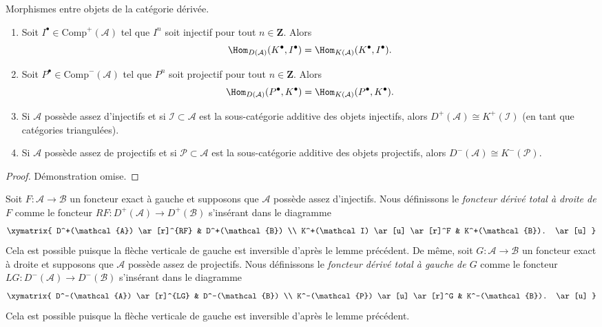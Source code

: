 \begin{lemma}
\label{lemma-derived-categories}
Morphismes entre objets de la catégorie dérivée.
\begin{enumerate}
\item
Soit $I^\bullet \in \text{Comp}^+(\mathcal{A})$ tel que $I^n$ soit injectif pour tout
$n \in \mathbf{Z}$. Alors
$$
\Hom_{D(\mathcal{A})}(K^\bullet, I^\bullet)
=
\Hom_{K(\mathcal{A})}(K^\bullet, I^\bullet).
$$
\item
Soit $P^\bullet \in \text{Comp}^-(\mathcal{A})$ tel que $P^n$ soit projectif pour tout
$n \in \mathbf{Z}$. Alors
$$
\Hom_{D(\mathcal{A})}(P^\bullet, K^\bullet)
=
\Hom_{K(\mathcal{A})}(P^\bullet, K^\bullet).
$$
\item
Si $\mathcal{A}$ possède assez d'injectifs et si $\mathcal{I} \subset \mathcal{A}$
est la sous-catégorie additive des objets injectifs, alors
$
D^+(\mathcal{A})\cong K^+(\mathcal{I})
$
(en tant que catégories triangulées).
\item
Si $\mathcal{A}$ possède assez de projectifs et si $\mathcal{P} \subset \mathcal{A}$
est la sous-catégorie additive des objets projectifs, alors
$
D^-(\mathcal{A}) \cong K^-(\mathcal{P}).
$
\end{enumerate}
\end{lemma}

\begin{proof}
Démonstration omise.
\end{proof}

\begin{definition}
\label{definition-derived-functor}
Soit $F: \mathcal{A} \to \mathcal{B}$ un foncteur exact à gauche et supposons que
$\mathcal{A}$ possède assez d'injectifs. Nous définissons le {\it foncteur dérivé total
à droite de $F$} comme le foncteur $RF: D^+(\mathcal{A}) \to D^+(\mathcal{B})$
s'insérant dans le diagramme
$$
\xymatrix{
D^+(\mathcal{A}) \ar[r]^{RF} & D^+(\mathcal{B}) \\
K^+(\mathcal I) \ar[u] \ar[r]^F & K^+(\mathcal{B}). \ar[u]
}
$$
Cela est possible puisque la flèche verticale de gauche est inversible d'après le lemme
précédent. De même, soit $G: \mathcal{A} \to \mathcal{B}$ un foncteur exact à droite
et supposons que $\mathcal{A}$ possède assez de projectifs. Nous définissons le
{\it foncteur dérivé total à gauche de $G$} comme le foncteur $LG: D^-(\mathcal{A})
\to D^-(\mathcal{B})$ s'insérant dans le diagramme
$$
\xymatrix{
D^-(\mathcal{A}) \ar[r]^{LG} & D^-(\mathcal{B}) \\
K^-(\mathcal{P}) \ar[u] \ar[r]^G & K^-(\mathcal{B}). \ar[u]
}
$$
Cela est possible puisque la flèche verticale de gauche est inversible d'après le lemme
précédent.
\end{definition}

